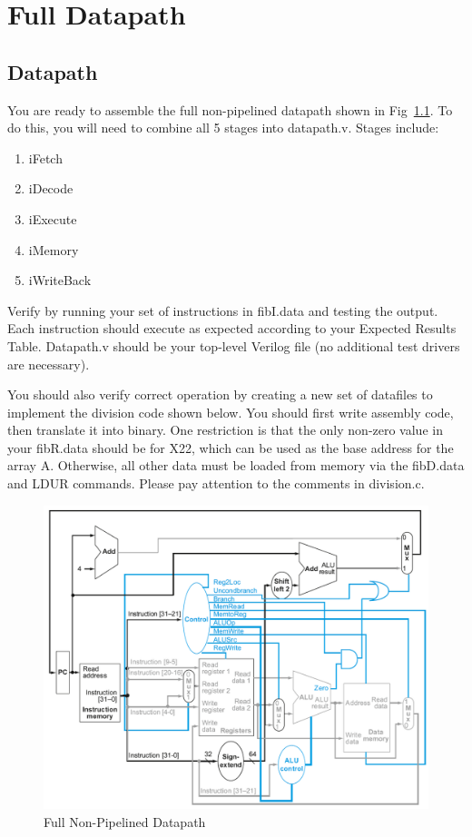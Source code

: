\chapter{Full Datapath}


\section{Datapath}
You are ready to assemble the full non-pipelined datapath shown in Fig~\ref{fig:datapath}.  To do this, you will need to combine all 5 stages into datapath.v.  Stages include:
\begin{enumerate}
\item iFetch
\item iDecode
\item iExecute
\item iMemory
\item iWriteBack
\end{enumerate} 

Verify by running your set of instructions in fibI.data and testing the output.  Each instruction should execute as expected according to your Expected Results Table.  Datapath.v should be your top-level Verilog file (no additional test drivers are necessary).

You should also verify correct operation by creating a new set of datafiles to implement the division code shown below.  You should first write assembly code, then translate it into binary.  One restriction is that the only non-zero value in your fibR.data should be for X22, which can be used as the base address for the array A.  Otherwise, all other data must be loaded from memory via the fibD.data and LDUR commands.  Please pay attention to the comments in division.c.


\begin{figure}
\caption{Full Non-Pipelined Datapath}\label{fig:datapath}
\begin{center}
\includegraphics[width=\textwidth]{../images/non_pipelined_datapath.png}
\end{center}
\end{figure}

